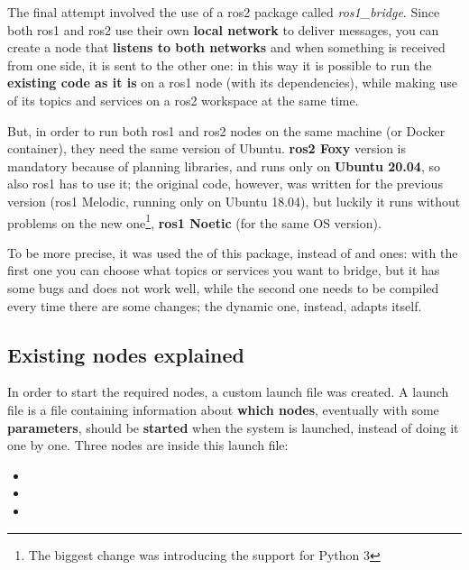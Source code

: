 The final attempt involved the use of a \acrshort{ros}2 package called \textit{ros1\_bridge}. Since both \acrshort{ros}1 and \acrshort{ros}2 use their own \textbf{local network} to deliver messages, you can create a node that \textbf{listens to both networks} and when something is received from one side, it is sent to the other one: in this way it is possible to run the \textbf{existing code as it is} on a \acrshort{ros}1 node (with its dependencies), while making use of its topics and services on a \acrshort{ros}2 workspace at the same time.

But, in order to run both \acrshort{ros}1 and \acrshort{ros}2 nodes on the same machine (or Docker container), they need the same version of Ubuntu. \textbf{\acrshort{ros}2 Foxy} version is mandatory because of planning libraries, and runs only on \textbf{Ubuntu 20.04}, so also \acrshort{ros}1 has to use it; the original code, however, was written for the previous version (\acrshort{ros}1 Melodic, running only on Ubuntu 18.04), but luckily it runs without problems on the new one\footnote{The biggest change was introducing the support for Python 3}, \textbf{\acrshort{ros}1 Noetic} (for the same OS version).

To be more precise, it was used the  of this package, instead of  and  ones: with the first one you can choose what topics or services you want to bridge, but it has some bugs and does not work well, while the second one needs to be compiled every time there are some changes; the dynamic one, instead, adapts itself.

\subsection{Existing nodes explained}
\label{subsec:nodes}

In order to start the required nodes, a custom launch file was created. A launch file is a file containing information about \textbf{which nodes}, eventually with some \textbf{parameters}, should be \textbf{started} when the system is launched, instead of doing it one by one. Three nodes are inside this launch file:

\begin{itemize}
    \item {}
    \item {}
    \item {}
\end{itemize}


